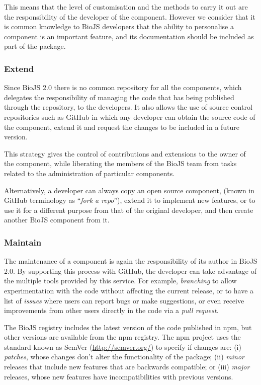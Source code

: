This means that the level of customisation and the methods to carry it out are the responsibility of the developer of the component. However we consider that it is common knowledge to BioJS developers that the ability to personalise a component is an important feature, and its documentation should be included as part of the package.

\subsubsection{Extend}
Since BioJS 2.0 there is no common repository for all the components, which delegates the responsibility of managing the code that has being published through the repository, to the developers. It also allows the use of source control repositories such as GitHub in which any developer can obtain the source code of the component, extend it and request the changes to be included in a future version.

This strategy gives the control of contributions and extensions to the owner of the component, while liberating the members of the BioJS team from tasks related to the administration of particular components.

Alternatively, a developer can always copy an open source component, (known in GitHub terminology as ``\emph{fork a repo}''), extend it to implement new features, or to use it for a different purpose from that of the original developer, and then create another BioJS component from it.

\subsubsection{Maintain}
The maintenance of a component is again the responsibility of its author in BioJS 2.0. By supporting this process with GitHub, the developer can take advantage of the multiple tools provided by this service. For example, \emph{branching} to allow experimentation with the code without affecting the current release, or to have a list of \emph{issues} where users can report bugs or make suggestions, or even receive improvements from other users directly in the code via a \emph{pull request}.

The BioJS registry includes the latest version of the code published in npm, but other versions are available from the npm registry. The npm project uses the standard known as SemVer (\url{http://semver.org/}) to specify if changes are: (i) \emph{patches}, whose changes don't alter the functionality of the package; (ii) \emph{minor} releases that include new features that are backwards compatible; or  (iii) \emph{major} releases, whose new features have incompatibilities with previous versions.

